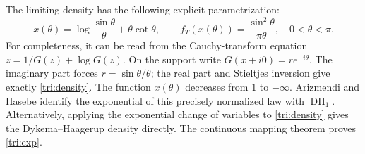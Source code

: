 The limiting density has the following explicit parametrization:
\begin{equation}\label{tri:density}
 x(\theta)=\log\frac{\sin\theta}{\theta}+\theta\cot\theta,\qquad
 f_T(x(\theta))=\frac{\sin^2\theta}{\pi\theta},
 \quad 0<\theta<\pi.
\end{equation}
For completeness, it can be read from the Cauchy-transform
equation $z=1/G(z)+\log G(z)$.
On the support write $G(x+i0)=r e^{-i\theta}$.
The imaginary part forces $r=\sin\theta/\theta$; the real part and
Stieltjes inversion give exactly \eqref{tri:density}.
The function $x(\theta)$ decreases from $1$ to $-\infty$.
Arizmendi and Hasebe \cite[Proposition 4.4]{triArizmendiHasebe}
identify the exponential of this precisely normalized law with
$\operatorname{DH}_1$.
Alternatively, applying the exponential change of variables to
\eqref{tri:density} gives the Dykema--Haagerup density directly.
The continuous mapping theorem proves \eqref{tri:exp}.


